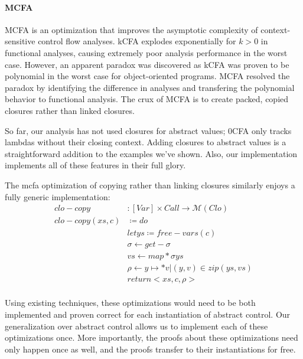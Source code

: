 \documentclass{article}
\begin{document}
\paragraph{MCFA}
MCFA is an optimization that improves the asymptotic complexity of context-sensitive control flow analyses.
kCFA explodes exponentially for $k > 0$ in functional analyses, causing extremely poor analysis performance in the worst case.
However, an apparent paradox was discovered as kCFA was proven to be polynomial in the worst case for object-oriented programs.
MCFA resolved the paradox by identifying the difference in analyses and transfering the polynomial behavior to functional analysis.
The crux of MCFA is to create packed, copied closures rather than linked closures.

So far, our analysis has not used closures for abstract values; 0CFA only tracks lambdas without their closing context.
Adding closures to abstract values is a straightforward addition to the examples we've shown.
Also, our implementation implements all of these features in their full glory.

The mcfa optimization of copying rather than linking closures similarly enjoys a fully generic implementation:
\begin{align*}
clo-copy       &: [Var] × Call → ℳ (Clo)             \\
clo-copy(xs,c) &≔ do                                 \\
               &let ys ≔ free-vars(c)                \\
               &σ ← get-σ                            \\
               &vs ← map* σ ys                       \\
               &ρ ← { y ↦* v | (y,v) ∈ zip(ys, vs) } \\
               &return <xs,c,ρ>                      \\
\end{align*}

Using existing techniques, these optimizations would need to be both implemented and proven correct for each instantiation of abstract control.
Our generalization over abstract control allows us to implement each of these optimizations once.
More importantly, the proofs about these optimizations need only happen once as well, and the proofs transfer to their instantiations for free.


\end{document}
